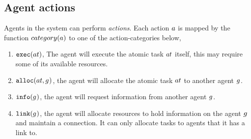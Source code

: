 \subsection{Agent actions}
\label{section:actions}

Agents in the system can perform \textit{actions}. Each action $\varAction{}{}$ is mapped by the function $\functionAgentActionType{}{}$ to one of the action-categories below,

\begin{enumerate}
	\item $\functionExec{}{}$, The agent will execute the atomic task $\varAtomicTask{}{}$ itself, this may require some of its available resources.
	\item $\functionAlloc{}{}$, the agent will allocate the atomic task $\varAtomicTask{}{}$ to another agent $g_{}^{}$.
	\item $\functionInfo{}{}$, the agent will request information from another agent $g_{}^{}$.
	\item $\functionLink{}{}$, the agent will allocate resources to hold information on the agent $g_{}^{}$ and maintain a connection. It can only allocate tasks to agents that it has a link to.
\end{enumerate}